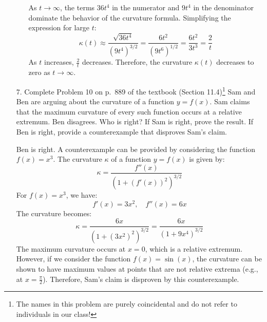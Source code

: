 \documentclass[reqno, 12pt]{amsart}
\begin{document}
\begin{itemize}
\begin{itemize}
        \begin{answerbox}
          As \( t \rightarrow \infty \), the terms \( 36t^4 \) in the numerator and \( 9t^4 \) in the denominator dominate the behavior of the curvature formula. Simplifying the expression for large \( t \):
          \[
            \kappa(t) \approx \frac{\sqrt{36t^4}}{(9t^4)^{3/2}} = \frac{6t^2}{(9t^6)^{1/2}} = \frac{6t^2}{3t^3} = \frac{2}{t}
          \]
          As \( t \) increases, \( \frac{2}{t} \) decreases. Therefore, the curvature \( \kappa(t) \) decreases to zero as \( t \rightarrow \infty \).
        \end{answerbox}
        \vspace{0.5 in}
    \end{itemize}
    \vspace{0.5 in}
    \newpage
  \item[7.] Complete Problem 10 on p.~889 of the textbook (Section 11.4)\footnote{The names in this problem are purely coincidental and do not refer to individuals in our class!}
    Sam and Ben are arguing about the curvature of a function $y=f(x)$. Sam claims that the maximum curvature of every such function occurs at a relative extremum. Ben disagrees. Who is right? If Sam is right, prove the result. If Ben is right, provide a counterexample that disproves Sam's claim.
    \newline

    \begin{answerbox}
      Ben is right. A counterexample can be provided by considering the function \( f(x) = x^3 \). The curvature \( \kappa \) of a function \( y = f(x) \) is given by:
      \[
        \kappa = \frac{f''(x)}{(1 + (f'(x))^2)^{3/2}}
      \]
      For \( f(x) = x^3 \), we have:
      \[
        f'(x) = 3x^2, \quad f''(x) = 6x
      \]
      The curvature becomes:
      \[
        \kappa = \frac{6x}{(1 + (3x^2)^2)^{3/2}} = \frac{6x}{(1 + 9x^4)^{3/2}}
      \]
      The maximum curvature occurs at \( x = 0 \), which is a relative extremum. However, if we consider the function \( f(x) = \sin(x) \), the curvature can be shown to have maximum values at points that are not relative extrema (e.g., at \( x = \frac{\pi}{2} \)).
      Therefore, Sam's claim is disproven by this counterexample.


    \end{answerbox}
\end{itemize}
\end{document}
